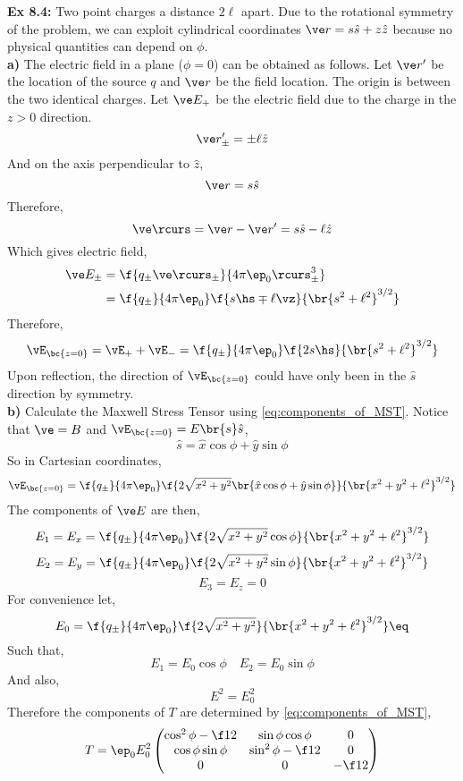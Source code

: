 \documentclass{article}
\begin{document}
\textbf{Ex 8.4:} Two point charges a distance $2 \ell$ apart. Due to the rotational symmetry of the problem, we can exploit cylindrical coordinates $\ve r = s\hat{s} + z \hat{z}$ because no physical quantities can depend on $\phi$.\\
\textbf{a)} The electric field in a plane ($\phi = 0$) can be obtained as follows. Let $\ve r'$ be the location of the source $q$ and $\ve r$ be the field location. The origin is between the two identical charges. Let $\ve E_{+}$ be the electric field due to the charge in the $z > 0$ direction.
\[ \ve r'_{\pm} = \pm \ell \hat{z} \]
And on the axis perpendicular to $\hat{z}$,
\[ \ve r = s \hat{s} \]
Therefore,
\[ \ve \rcurs = \ve r - \ve r' = s\hat{s} - \ell \hat z \]
Which gives electric field,
\begin{align*}
\ve E_{\pm} &= \f{q_{\pm} \ve \rcurs_\pm}{4 \pi \ep_0 \rcurs_\pm^3} \\
&= \f{q_{\pm}}{4 \pi \ep_0} \f{s \hs \mp \ell \vz}{\br{ s^2 + \ell^2}^{3/2}}
\end{align*}
Therefore,
\[ \vE_{\bc{z = 0}} = \vE_{+} + \vE_{-} = \f{q_{\pm}}{4 \pi \ep_0} \f{2 s \hs}{\br{ s^2 + \ell^2}^{3/2}} \]
Upon reflection, the direction of $\vE_{\bc{z = 0}}$ could have only been in the $\hat s$ direction by symmetry. \\
\textbf{b)} Calculate the Maxwell Stress Tensor using \cref{eq:components_of_MST}. Notice that $\ve = B$ and $\vE_{\bc{z=0}} = E\br{s} \hat{s}$,
\[ \hat{s} = \hat{x}\cos\phi + \hat{y}\sin\phi \]
So in Cartesian coordinates,
\[ \vE_{\bc{z = 0}} = \f{q_{\pm}}{4 \pi \ep_0} \f{2 \sqrt{x^2 + y^2}\br{\hat{x}\cos\phi + \hat{y}\sin\phi}}{\br{ x^2 + y^2 + \ell^2}^{3/2}} \]
The components of $\ve E$ are then,
\[ E_1 = E_x = \f{q_{\pm}}{4 \pi \ep_0} \f{2 \sqrt{x^2 + y^2}\cos\phi}{\br{ x^2 + y^2 + \ell^2}^{3/2}} \]
\[ E_2 = E_y = \f{q_{\pm}}{4 \pi \ep_0} \f{2 \sqrt{x^2 + y^2}\sin\phi}{\br{ x^2 + y^2 + \ell^2}^{3/2}} \]
\[ E_3 = E_z = 0 \]
For convenience let,
\[ E_0 = \f{q_{\pm}}{4 \pi \ep_0} \f{2 \sqrt{x^2 + y^2}}{\br{ x^2 + y^2 + \ell^2}^{3/2}} \eq \label{eq:E_0}\]
Such that,
\[ E_1 = E_0 \cos \phi \quad E_2 = E_0 \sin \phi\]
And also,
\[ E^2 = E_0^2 \]
Therefore the components of $T$ are determined by \cref{eq:components_of_MST},
\[ T = \ep_0 E_0^2 \begin{pmatrix}
    \cos^2 \phi - \f12 & \sin \phi \cos \phi & 0 \\
    \cos \phi \sin \phi & \sin^2 \phi - \f12 & 0 \\
    0 & 0 & - \f12 \\
\end{pmatrix} \]
\end{document}

